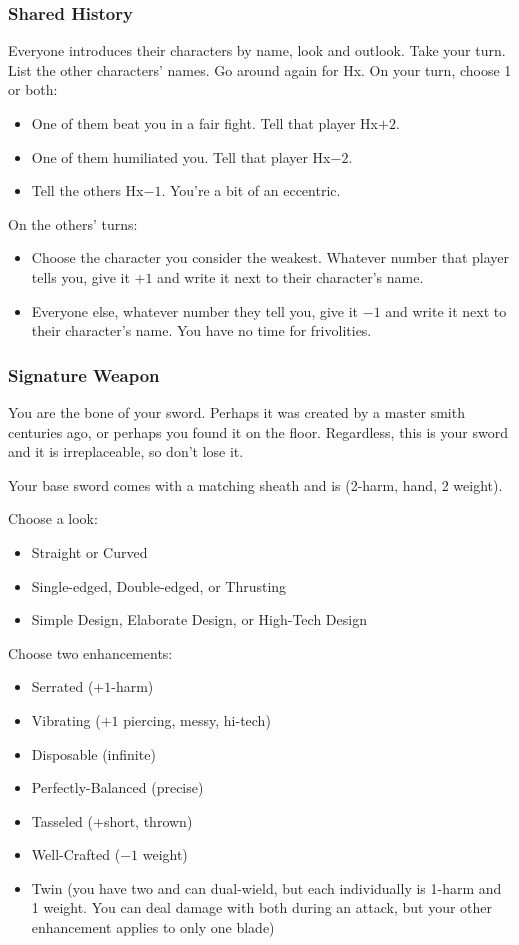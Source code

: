 \subsubsection{Shared History}
Everyone introduces their characters by name, look and outlook. Take
your turn.  List the other characters' names.  Go around again for
Hx. On your turn, choose 1 or both:
\begin{itemize} %
\item One of them beat you in a fair fight. Tell that player Hx$+2$.
\item One of them humiliated you. Tell that player Hx$-2$.
\item Tell the others Hx$-1$. You're a bit of an eccentric.
\end{itemize}
On the others’ turns:
\begin{itemize} %
\item Choose the character you consider the weakest. Whatever number
  that player tells you, give it $+1$ and write it next to their
  character's name.
\item Everyone else, whatever number they tell you, give it $-1$ and
  write it next to their character’s name. You have no time for
  frivolities.
\end{itemize}

\subsubsection{Signature Weapon}
You are the bone of your sword. Perhaps it was created by a master smith centuries ago, or perhaps you found it on the floor. Regardless, this is your sword and it is irreplaceable, so don't lose it.

Your base sword comes with a matching sheath and is (2-harm, hand, 2 weight).

Choose a look:
\begin{itemize}
\item Straight or Curved
\item Single-edged, Double-edged, or Thrusting
\item Simple Design, Elaborate Design, or High-Tech Design
\end{itemize}

Choose two enhancements:
\begin{itemize}
\item Serrated ($+1$-harm)
\item Vibrating ($+1$ piercing, messy, hi-tech)
\item Disposable (infinite)
\item Perfectly-Balanced (precise)
\item Tasseled (+short, thrown)
\item Well-Crafted ($-1$ weight)
\item Twin (you have two and can dual-wield, but each individually is 1-harm and 1 weight. You can deal damage with both during an attack, but your other enhancement applies to only one blade)
\end{itemize}

